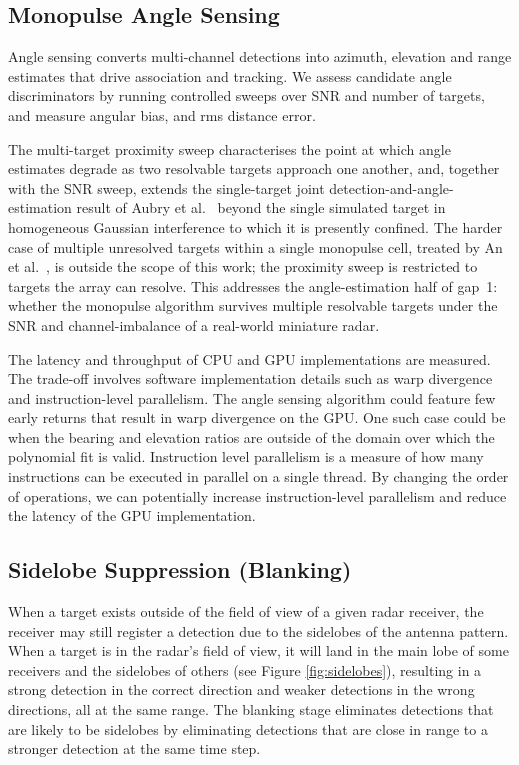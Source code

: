\subsection{Monopulse Angle Sensing}
Angle sensing converts multi-channel detections into azimuth, elevation and range estimates that 
drive association and tracking. We assess candidate angle discriminators by running controlled 
sweeps over SNR and number of targets, and measure angular bias, and \gls{rms} distance error. 

The 
multi-target proximity sweep characterises the point at which angle estimates 
degrade as two resolvable targets approach one another, and, together with the SNR 
sweep, extends the single-target joint detection-and-angle-estimation result of 
Aubry et al.\ 
\cite{aubry2020_single_pulse_simultaneous_detection_angle_estimation_multichannel} 
beyond the single simulated target in homogeneous Gaussian interference to which it 
is presently confined. The harder case of multiple unresolved targets within a 
single monopulse cell, treated by An et al.\ 
\cite{an2024_time_varying_angle_estimation_unresolved_extended_targets_monopulse}, 
is outside the scope of this work; the proximity sweep is restricted to targets the 
array can resolve. This addresses the angle-estimation half of gap~1: whether the 
monopulse algorithm survives multiple resolvable targets under the SNR and channel-imbalance
of a real-world miniature radar. 

The latency and throughput of CPU and GPU implementations are measured. The trade-off involves 
software implementation details such as warp divergence and instruction-level parallelism. 
The angle sensing algorithm could feature few early returns that result in warp divergence on the GPU. 
One such case could be when the bearing and elevation ratios are outside of the domain over which the 
polynomial
fit is valid. Instruction level parallelism is a measure of how many instructions can be executed 
in parallel on a single thread. By changing the order of operations, we can potentially increase 
instruction-level parallelism and reduce the latency of the GPU implementation.

\subsection{Sidelobe Suppression (Blanking)}
When a target exists outside of the field of view of a given radar receiver, the receiver may still
register a detection due to the sidelobes of the antenna pattern. When a target is in the radar's 
field of view, it will land in the main lobe of some receivers and the sidelobes of others (see Figure 
\ref{fig:sidelobes}), resulting
in a strong detection in the correct direction and weaker detections in the wrong directions, all at
the same range. The blanking stage eliminates detections that are likely to be sidelobes by eliminating
detections that are close in range to a stronger detection at the same time step. 

